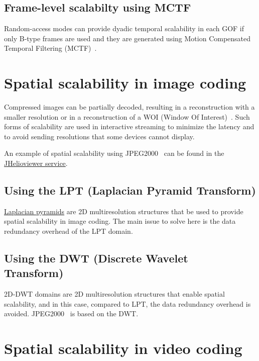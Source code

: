 \subsection{Frame-level scalabilty using MCTF}

Random-access modes can provide dyadic temporal scalability in each
GOF if only B-type frames are used and they are generated using Motion
Compensated Temporal Filtering (MCTF)~\cite{vruiz__MC,vruiz__MCTF}.


\section{Spatial scalability in image coding~\cite{vruiz__JPEG2000}}


Compressed images can be partially decoded, resulting in a
reconstruction with a smaller resolution or in a reconstruction of a
WOI (Window Of Interest)~\cite{vruiz__JPEG2000}. Such forms of scalability are used in
interactive streaming to minimize the latency and to avoid sending
resolutions that some devices cannot display.

An example of spatial scalability using
JPEG2000~\cite{vruiz__JPEG2000} can be found in the
\href{https://www.jhelioviewer.org/}{JHelioviewer service}.

\subsection{Using the LPT (Laplacian Pyramid Transform)}

\href{https://en.wikipedia.org/wiki/Pyramid_(image_processing)#Laplacian_pyramid}{Laplacian
  pyramids} are 2D multiresolution structures that be used to provide
spatial scalability in image coding. The main issue to solve here is
the data redundancy overhead of the LPT domain.

\subsection{Using the DWT (Discrete Wavelet Transform)~\cite{vruiz__JPEG2000}}

2D-DWT domains are 2D multiresolution structures that enable spatial
scalability, and in this case, compared to LPT, the data redundancy
overhead is avoided. JPEG2000~\cite{vruiz__JPEG2000} is based on the
DWT.


\section{Spatial scalability in video coding~\cite{vruiz__video_scalability}}

